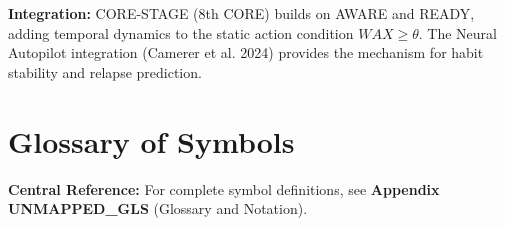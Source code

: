 \begin{tcolorbox}[colback=green!10!white, colframe=green!75!black,
    title=\textbf{Appendix UNMAPPED_STA: Summary}]
\textbf{Integration:} CORE-STAGE (8th CORE) builds on AWARE and READY, adding temporal dynamics to the static action condition $WAX \geq \theta$. The Neural Autopilot integration (Camerer et al. 2024) provides the mechanism for habit stability and relapse prediction.

\end{tcolorbox}



\section{Glossary of Symbols}
\label{sec:bcj-glossary}

\begin{tcolorbox}[colback=blue!5!white, colframe=blue!75!black]
\textbf{Central Reference:} For complete symbol definitions, see \textbf{Appendix UNMAPPED_GLS} (Glossary and Notation).
\end{tcolorbox}

